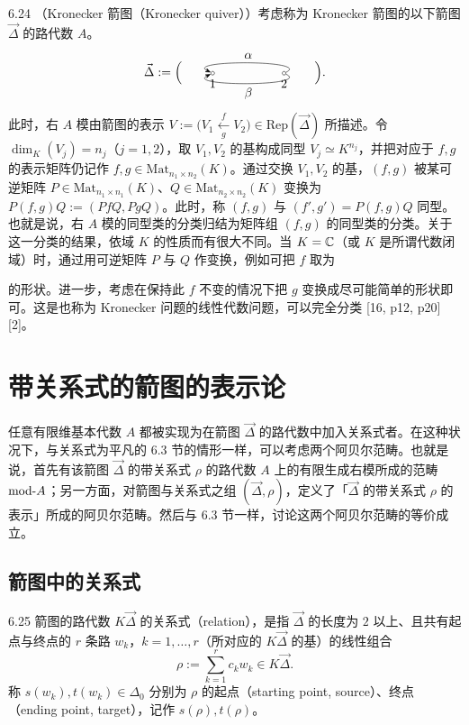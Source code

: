 \begin{example}{6.24}
（Kronecker 箭图（Kronecker quiver））考虑称为 Kronecker 箭图的以下箭图 $\vec{\Delta}$ 的路代数 $A$。
\[
\vec{\Delta}:=\Bigl(\,
\begin{tikzpicture}[baseline=-0.5ex]
  \node[draw,circle,inner sep=1pt,label=below:{$1$}] (v1) at (0,0) {};
  \node[draw,circle,inner sep=1pt,label=below:{$2$}] (v2) at (2.0,0) {};
  \draw[-{Stealth}] (v2) to[out=25,in=155] node[above]{$\alpha$} (v1);
  \draw[-{Stealth}] (v2) to[out=-25,in=-155] node[below]{$\beta$} (v1);
\end{tikzpicture}
\,\Bigr).
\]
此时，右 $A$ 模由箭图的表示 $V:=\bigl(V_1\xleftarrow[\ g\ ]{\ f\ }V_2\bigr)\in\mathrm{Rep}(\vec{\Delta})$ 所描述。令 $\dim_K(V_j)=n_j$（$j=1,2$），取 $V_1,V_2$ 的基构成同型 $V_j\simeq K^{n_j}$，并把对应于 $f,g$ 的表示矩阵仍记作 $f,g\in\mathrm{Mat}_{n_1\times n_2}(K)$。通过交换 $V_1,V_2$ 的基，$(f,g)$ 被某可逆矩阵 $P\in\mathrm{Mat}_{n_1\times n_1}(K)$、$Q\in\mathrm{Mat}_{n_2\times n_2}(K)$ 变换为 $P(f,g)Q:=(PfQ,PgQ)$。此时，称 $(f,g)$ 与 $(f',g')=P(f,g)Q$ 同型。也就是说，右 $A$ 模的同型类的分类归结为矩阵组 $(f,g)$ 的同型类的分类。关于这一分类的结果，依域 $K$ 的性质而有很大不同。当 $K=\mathbb{C}$（或 $K$ 是所谓代数闭域）时，通过用可逆矩阵 $P$ 与 $Q$ 作变换，例如可把 $f$ 取为

的形状。进一步，考虑在保持此 $f$ 不变的情况下把 $g$ 变换成尽可能简单的形状即可。这是也称为 Kronecker 问题的线性代数问题，可以完全分类 [16, p12, p20] [2]。
\end{example}

\section{带关系式的箭图的表示论}

任意有限维基本代数 $A$ 都被实现为在箭图 $\vec{\Delta}$ 的路代数中加入关系式者。在这种状况下，与关系式为平凡的 6.3 节的情形一样，可以考虑两个阿贝尔范畴。也就是说，首先有该箭图 $\vec{\Delta}$ 的带关系式 $\rho$ 的路代数 $A$ 上的有限生成右模所成的范畴 $\mathrm{mod}\text{-}A$；另一方面，对箭图与关系式之组 $(\vec{\Delta},\rho)$，定义了「$\vec{\Delta}$ 的带关系式 $\rho$ 的表示」所成的阿贝尔范畴。然后与 6.3 节一样，讨论这两个阿贝尔范畴的等价成立。

\subsection{箭图中的关系式}

\begin{definition}{6.25}
箭图的路代数 $K\vec{\Delta}$ 的关系式（relation），是指 $\vec{\Delta}$ 的长度为 $2$ 以上、且共有起点与终点的 $r$ 条路 $w_k$，$k=1,\dots,r$（所对应的 $K\vec{\Delta}$ 的基）的线性组合
\[
\rho:=\sum_{k=1}^{r}c_kw_k\in K\vec{\Delta}.
\]
称 $s(w_k),t(w_k)\in\Delta_0$ 分别为 $\rho$ 的起点（starting point, source）、终点（ending point, target），记作 $s(\rho),t(\rho)$。
\end{definition}

